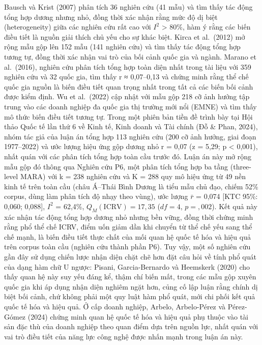 \documentclass[
  a4paper,
  13pt]{extreport}
\begin{document}
Bausch và Krist (2007) phân tích 36 nghiên cứu (41 mẫu) và tìm thấy tác
động tổng hợp dương nhưng nhỏ, đồng thời xác nhận rằng mức độ dị biệt
(heterogeneity) giữa các nghiên cứu rất cao với \(I^2\) \textgreater{}
80\%, hàm ý rằng các biến điều tiết là nguồn giải thích chủ yếu cho sự
khác biệt. Kirca et al.~(2012) mở rộng mẫu gộp lên 152 mẫu (141 nghiên
cứu) và tìm thấy tác động tổng hợp tương tự, đồng thời xác nhận vai trò
của bối cảnh quốc gia và ngành. Marano et al.~(2016), nghiên cứu phân
tích tổng hợp toàn diện nhất trong tài liệu với 359 nghiên cứu và 32
quốc gia, tìm thấy r ≈ 0,07--0,13 và chứng minh rằng thể chế quốc gia
nguồn là biến điều tiết quan trọng nhất trong tất cả các biến bối cảnh
được kiểm định. Wu et al.~(2022) cập nhật với mẫu gộp 218 cỡ ảnh hưởng
tập trung vào các doanh nghiệp đa quốc gia thị trường mới nổi (EMNE) và
tìm thấy mô thức biến điều tiết tương tự. Trong một phiên bản tiền đề
trình bày tại Hội thảo Quốc tế lần thứ 6 về Kinh tế, Kinh doanh và Tài
chính (Đỗ \& Phan, 2024), nhóm tác giả của luận án tổng hợp 113 nghiên
cứu (200 cỡ ảnh hưởng, giai đoạn 1977--2022) và ước lượng hiệu ứng gộp
dương nhỏ r = 0,07 (z = 5,29; p \textless{} 0,001), nhất quán với các
phân tích tổng hợp toàn cầu trước đó. Luận án này mở rộng mẫu gộp đó
thông qua Nghiên cứu P6, một phân tích tổng hợp ba tầng (three-level
MARA) với k = 238 nghiên cứu và K = 288 quy mô hiệu ứng từ 49 nền kinh
tế trên toàn cầu (châu Á--Thái Bình Dương là tiểu mẫu chủ đạo, chiếm
52\% corpus, dùng làm phân tích độ nhạy theo vùng), ước lượng \(\bar r\)
= 0,074 {[}KTC 95\%: 0,060; 0,088{]}, \(I^2\) = 62,4\%,
\(Q_M(\mathrm{ICRV}) = 17{,}35\) (\(df = 4\), \(p = {,}002\)). Kết quả
này xác nhận tác động tổng hợp dương nhỏ nhưng bền vững, đồng thời chứng
minh rằng phổ thể chế ICRV, điểm uốn giảm dần khi chuyển từ thể chế yếu
sang thể chế mạnh, là biến điều tiết thực chất của mối quan hệ quốc tế
hóa và hiệu quả trên corpus toàn cầu (nghiên cứu thành phần P6). Tuy
vậy, một số nghiên cứu gần đây sử dụng chiến lược nhận diện chặt chẽ hơn
đặt câu hỏi về tính phổ quát của dạng hàm chữ U ngược: Pisani,
Garcia-Bernardo và Heemskerk (2020) cho thấy quan hệ này suy yếu đáng
kể, thậm chí biến mất, trong các mẫu gộp xuyên quốc gia khi áp dụng nhận
diện nghiêm ngặt hơn, củng cố lập luận rằng chính dị biệt bối cảnh, chứ
không phải một quy luật hàm phổ quát, mới chi phối kết quả quốc tế hóa
và hiệu quả. Ở cấp doanh nghiệp, Arbelo, Arbelo-Pérez và Pérez-Gómez
(2024) chứng minh quan hệ quốc tế hóa và hiệu quả phụ thuộc vào tài sản
đặc thù của doanh nghiệp theo quan điểm dựa trên nguồn lực, nhất quán
với vai trò điều tiết của năng lực công nghệ được nhấn mạnh trong luận
án này.
\end{document}
